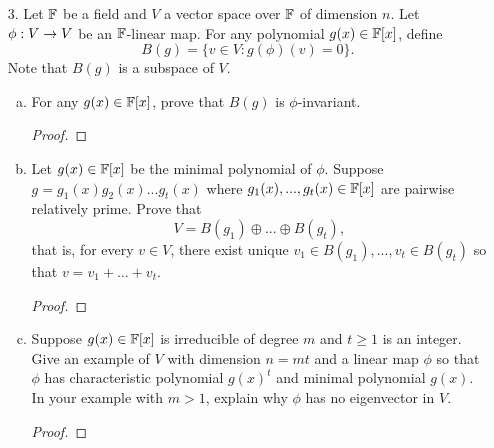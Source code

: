 \begin{itemize}
\begin{enumerate}[(a)]
\begin{proof}
    \end{proof}

    \item Let $V$ be the vector space of all polynomial functions from $\bbr$ to $\bbr$ which have degree less than or equal to $n - 1$. Let $t_1, . . . , t_n$ be any $n$ distinct real numbers, and define linear functionals $L_i(p) = p(t_i)$ on $V$. Show that $L_1, . . . , L_n$ are linearly independent.
    \begin{proof}

    \end{proof}
\end{enumerate}






\item[3.] Let $\mathbb{F}$ be a field and $V$ a vector space over $\mathbb{F}$ of dimension $n$. Let $\phi : V \rightarrow V$ be an
$\mathbb{F}$-linear map. For any polynomial $g(x) \in \mathbb{F}[x]$, define
$$B(g) = \{v \in V : g(\phi)(v) = 0\}.$$
Note that $B(g)$ is a subspace of $V$.
\begin{enumerate}[(a)]
    \item For any $g(x) \in \mathbb{F}[x]$, prove that $B(g)$ is $\phi$-invariant.
    \begin{proof}

    \end{proof}

    \item Let $g(x) \in \mathbb{F}[x]$ be the minimal polynomial of $\phi$. Suppose $g = g_1(x)g_2(x) ... g_t(x)$ where $g_1(x), ..., g_t(x) \in \mathbb{F}[x]$ are pairwise relatively prime. Prove that $$V = B(g_1) \oplus ... \oplus B(g_t),$$ that is, for every $v\in V$, there exist unique $v_1 \in B(g_1), ..., v_t \in B(g_t)$ so that $v = v_1 + ... + v_t$.
    \begin{proof}

    \end{proof}

    \item Suppose $g(x) \in \mathbb{F}[x]$ is irreducible of degree $m$ and $t \geq 1$ is an integer. Give an example of $V$ with dimension $n = mt$ and a linear map $\phi$ so that $\phi$ has characteristic polynomial $g(x)^t$ and minimal polynomial $g(x)$. In your example with $m > 1$, explain why $\phi$ has no eigenvector in $V$. 
    \begin{proof}

    \end{proof}
\end{enumerate}






\end{itemize}
